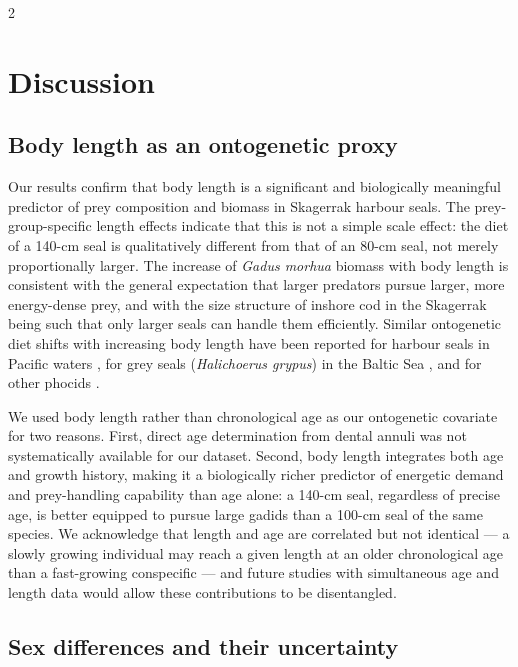 \begin{spacing}{2}
\section{Discussion}

\subsection{Body length as an ontogenetic proxy}

Our results confirm that body length is a significant and biologically
meaningful predictor of prey composition and biomass in Skagerrak harbour
seals. The prey-group-specific length effects indicate that this is not a
simple scale effect: the diet of a 140-cm seal is qualitatively different
from that of an 80-cm seal, not merely proportionally larger. The increase
of \textit{Gadus morhua} biomass with body length is consistent with the
general expectation that larger predators pursue larger, more energy-dense
prey, and with the size structure of inshore cod in the Skagerrak being such
that only larger seals can handle them efficiently. Similar ontogenetic diet
shifts with increasing body length have been reported for harbour seals in
Pacific waters \citep{Pitcher1980}, for grey seals (\textit{Halichoerus
grypus}) in the Baltic Sea \citep{Lundstrom2010, Tverin2019}, and for other
phocids \citep{Young2010, Neises2021}.

We used body length rather than chronological age as our ontogenetic
covariate for two reasons. First, direct age determination from dental
annuli was not systematically available for our dataset. Second, body length
integrates both age and growth history, making it a biologically richer
predictor of energetic demand and prey-handling capability than age alone: a
140-cm seal, regardless of precise age, is better equipped to pursue large
gadids than a 100-cm seal of the same species. We acknowledge that length
and age are correlated but not identical --- a slowly growing individual may
reach a given length at an older chronological age than a fast-growing
conspecific --- and future studies with simultaneous age and length data
would allow these contributions to be disentangled.

\subsection{Sex differences and their uncertainty}


\end{spacing}
